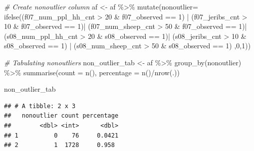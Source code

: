 \documentclass[
]{article}
\newenvironment{Shaded}{\begin{snugshade}}{\end{snugshade}}
\newcommand{\AttributeTok}[1]{\textcolor[rgb]{0.77,0.63,0.00}{#1}}
\newcommand{\CommentTok}[1]{\textcolor[rgb]{0.56,0.35,0.01}{\textit{#1}}}
\newcommand{\DecValTok}[1]{\textcolor[rgb]{0.00,0.00,0.81}{#1}}
\newcommand{\FunctionTok}[1]{\textcolor[rgb]{0.00,0.00,0.00}{#1}}
\newcommand{\NormalTok}[1]{#1}
\newcommand{\OtherTok}[1]{\textcolor[rgb]{0.56,0.35,0.01}{#1}}
\newcommand{\SpecialCharTok}[1]{\textcolor[rgb]{0.00,0.00,0.00}{#1}}
\begin{document}
\begin{Shaded}
\begin{Highlighting}[]
\CommentTok{\# Create nonoutlier column}
\NormalTok{af }\OtherTok{\textless{}{-}}\NormalTok{ af }\SpecialCharTok{\%\textgreater{}\%} \FunctionTok{mutate}\NormalTok{(}\AttributeTok{nonoutlier=} \FunctionTok{ifelse}\NormalTok{((f07\_num\_ppl\_hh\_cnt }\SpecialCharTok{\textgreater{}} \DecValTok{20} \SpecialCharTok{\&}\NormalTok{ f07\_observed }\SpecialCharTok{==} \DecValTok{1}\NormalTok{) }\SpecialCharTok{|}
\NormalTok{                                    (f07\_jeribs\_cnt }\SpecialCharTok{\textgreater{}} \DecValTok{10} \SpecialCharTok{\&}\NormalTok{ f07\_observed }\SpecialCharTok{==} \DecValTok{1}\NormalTok{)}\SpecialCharTok{|}
\NormalTok{                                    (f07\_num\_sheep\_cnt }\SpecialCharTok{\textgreater{}} \DecValTok{50} \SpecialCharTok{\&}\NormalTok{ f07\_observed }\SpecialCharTok{==} \DecValTok{1}\NormalTok{)}\SpecialCharTok{|}
\NormalTok{                                      (s08\_num\_ppl\_hh\_cnt }\SpecialCharTok{\textgreater{}} \DecValTok{20} \SpecialCharTok{\&}\NormalTok{ s08\_observed }\SpecialCharTok{==} \DecValTok{1}\NormalTok{)}\SpecialCharTok{|}
\NormalTok{                                      (s08\_jeribs\_cnt }\SpecialCharTok{\textgreater{}} \DecValTok{10} \SpecialCharTok{\&}\NormalTok{ s08\_observed }\SpecialCharTok{==} \DecValTok{1}\NormalTok{) }\SpecialCharTok{|}
\NormalTok{                                      (s08\_num\_sheep\_cnt }\SpecialCharTok{\textgreater{}} \DecValTok{50} \SpecialCharTok{\&}\NormalTok{ s08\_observed }\SpecialCharTok{==} \DecValTok{1}\NormalTok{)}
\NormalTok{                                      ,}\DecValTok{0}\NormalTok{,}\DecValTok{1}\NormalTok{))}


\CommentTok{\# Tabulating nonoutliers}
\NormalTok{non\_outlier\_tab }\OtherTok{\textless{}{-}}\NormalTok{ af }\SpecialCharTok{\%\textgreater{}\%} \FunctionTok{group\_by}\NormalTok{(nonoutlier) }\SpecialCharTok{\%\textgreater{}\%} 
    \FunctionTok{summarise}\NormalTok{(}\AttributeTok{count =} \FunctionTok{n}\NormalTok{(), }\AttributeTok{percentage =} \FunctionTok{n}\NormalTok{()}\SpecialCharTok{/}\FunctionTok{nrow}\NormalTok{(.))}

\NormalTok{non\_outlier\_tab}
\end{Highlighting}
\end{Shaded}

\begin{verbatim}
## # A tibble: 2 x 3
##   nonoutlier count percentage
##        <dbl> <int>      <dbl>
## 1          0    76     0.0421
## 2          1  1728     0.958
\end{verbatim}
\end{document}
